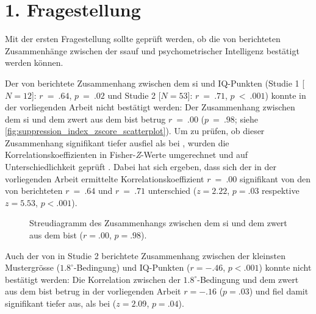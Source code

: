 \documentclass[11pt, twoside, a4paper]{book}		%
\begin{document}
\clearpage
\section{1. Fragestellung}

Mit der ersten Fragestellung sollte geprüft werden, ob die von \citet{Melnick2013} berichteten Zusammenhänge zwischen der \gls{ssauf} und psychometrischer Intelligenz bestätigt werden können. 

Der von \citet{Melnick2013} berichtete Zusammenhang zwischen dem \gls{si} und IQ-Punkten (Studie 1 [$N=12$]: $r~=~.64$, $p~=~.02$ und Studie 2 [$N=53$]: $r~=~.71$, $p~<~.001$) konnte in der vorliegenden Arbeit nicht bestätigt werden: Der Zusammenhang zwischen dem \gls{si} und dem \gls{zwert} aus dem \gls{bist} betrug $r~=~.00$ ($p~=~.98$; siehe \autoref{fig:suppression_index_zscore_scatterplot}). 
Um zu prüfen, ob dieser Zusammenhang signifikant tiefer ausfiel als bei \citeauthor{Melnick2013}, wurden die Korrelationskoeffizienten in Fisher-\textit{Z}-Werte umgerechnet und  auf Unterschiedlichkeit geprüft \citep[][S. 54]{Cohen1983}. 
Dabei hat sich ergeben, dass sich der in der vorliegenden Arbeit ermittelte Korrelationskoeffizient $r~=~.00$ signifikant von den von \citet{Melnick2013} berichteten $r~=~.64$ und $r~=~.71$ unterschied ($z=2.22$, $p=.03$ respektive $z=5.53$, $p<.001$).

\begin{figure}[t]
	\centering
	\begin{adjustbox}{width=1\textwidth}
		
	\end{adjustbox}
	\caption[Zusammenhang zwischen \gls{si} und \gls{zwert} des \gls{bist}]{Streudiagramm des Zusammenhangs zwischen dem \gls{si} und dem \gls{zwert} aus dem \gls{bist} ($r=.00$, $p=.98$).}
	\label{fig:suppression_index_zscore_scatterplot}
\end{figure}

Auch der von \citet{Melnick2013} in Studie 2 berichtete Zusammenhang zwischen der kleinsten Mustergrösse ($1.8^{\circ}$-Bedingung) und IQ-Punkten ($r=-.46$, $p<.001$) konnte nicht bestätigt werden: Die Korrelation zwischen der $1.8^{\circ}$-Bedingung und dem \gls{zwert} aus dem \gls{bist} betrug in der vorliegenden Arbeit $r=-.16$ ($p=.03$) und fiel damit signifikant tiefer aus, als bei \citeauthor{Melnick2013} ($z=2.09$, $p=.04$).
\end{document}
